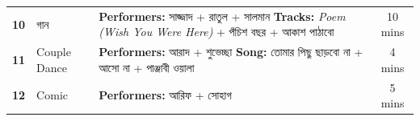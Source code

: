 \documentclass[11pt,a4paper]{article}
\begin{document}
\begin{table}[htbp]
\begin{tabularx}{\textwidth}{c p{3.2cm} X c}
\textbf{10} & 
\textbengali{গান} & 
\textbf{Performers:} \textbengali{সাজ্জাদ + রাতুল + সালমান} \newline
\textbf{Tracks:} \textit{Poem (Wish You Were Here)} + \textbengali{পঁচিশ বছর + আকাশ পাঠাবো} & 
10 mins \\

\textbf{11} & 
Couple Dance & 
\textbf{Performers:} \textbengali{আরাদ + শুভেচ্ছা} \newline
\textbf{Song:} \textbengali{তোমার পিছু ছাড়বো না + আসো না + পাঞ্জাবী ওয়ালা} & 
4 mins \\

\textbf{12} & 
Comic & 
\textbf{Performers:} \textbengali{আরিফ + সোহাগ} & 
5 mins \\

\bottomrule
\end{tabularx}
\end{table}

\newpage
\end{document}
